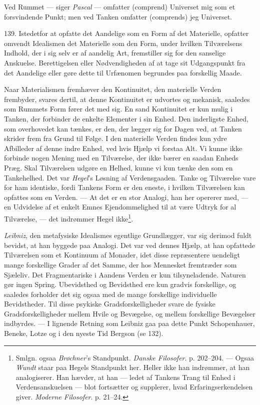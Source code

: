 \documentclass[12pt,a4paper]{book}
\newcommand{\apage}[1]{\marginnote{\footnotesize\textit{[#1]}}}
\begin{document}
Ved Rummet --- siger \emph{Pascal} --- omfatter (comprend) Universet mig som et
forsvindende Punkt; men ved Tanken omfatter (comprends) jeg Universet.

139. Istedetfor at opfatte det Aandelige som en Form af det Materielle, opfatter omvendt
Idealismen det Materielle som den Form, under hvilken Tilværelsens Indhold, der i sig selv
er af aandelig Art, fremstiller sig for den sanselige Anskuelse. Berettigelsen eller
Nødvendigheden af at tage sit Udgangspunkt fra det Aandelige eller gøre dette til
Urfænomen begrundes paa forskellig Maade.

Naar Materialismen fremhæver den Kontinuitet, den materielle Verden frembyder, svares
dertil, at denne Kontinuitet er udvortes og mekanisk, saaledes som Rummets Form fører det
med sig. En sand Kontinuitet er kun mulig i Tanken, der forbinder de enkelte Elementer i
sin Enhed. Den inderligste Enhed, som overhovedet kan tænkes, er den, der lægger sig for
Dagen ved, at Tanken skrider frem fra Grund til Følge. I den materielle Verden findes kun
ydre Afbilleder af denne indre Enhed, ved hvis Hjælp vi forstaa Alt. Vi kunne ikke
forbinde nogen Mening med en Tilværelse, der ikke bærer en saadan Enheds Præg. Skal
Tilværelsen udgøre en Helhed, kunne vi kun tænke den som en Tankehelhed. Det var
\emph{Hegel}'s Løsning af Verdensgaaden. Tanke og Tilværelse vare for ham identiske, fordi
Tankens Form er den eneste, i hvilken Tilværelsen kan opfattes som en Verden. --- At det er
en stor Analogi, han her opererer med, --- en Udvidelse af et enkelt Emnes
Ejendommelighed til at være Udtryk for al Tilværelse, --- det indrømmer Hegel
ikke\footnote{Smlgn. ogsaa \emph{Brøchner}'s Standpunkt. \emph{Danske Filosofer}. p.
202--204. --- Ogsaa \emph{Wundt} staar paa Hegels Standpunkt her. Heller ikke han
indrømmer, at han analogiserer. Han hævder, at han --- ledet af Tankens Trang til Enhed i
Verdensanskuelsen --- blot fortsætter og supplerer, hvad Erfaringserkendelsen giver.
\emph{Moderne Filosofer}. p. 21--24.}.

\emph{Leibniz}, den metafysiske Idealismes egentlige Grundlægger, var sig derimod fuldt
bevidst, at han byggede paa Analogi. Det var ved dennes Hjælp, at han opfattede \apage{334} Tilværelsen
som et Kontinuum af Monader, idet disse repræsentere uendeligt mange forskellige Grader af
det Samme, der hos Mennesket fremtræder som Sjæleliv. Det Fragmentariske i Aandens Verden
er kun tilsyneladende. Naturen gør ingen Spring. Ubevidsthed og Bevidsthed ere kun gradvis
forskellige, og saaledes forholder det sig ogsaa med de mange forskellige individuelle
Bevidstheder. Til disse psykiske Gradsforskelligheder svare de fysiske
Gradsforskelligheder mellem Hvile og Bevægelse, og mellem forskellige Bevægelser
indbyrdes. --- I lignende Retning som Leibniz gaa paa dette Punkt Schopenhauer, Beneke,
Lotze og i den nyeste Tid Bergson (se 132).
\end{document}
